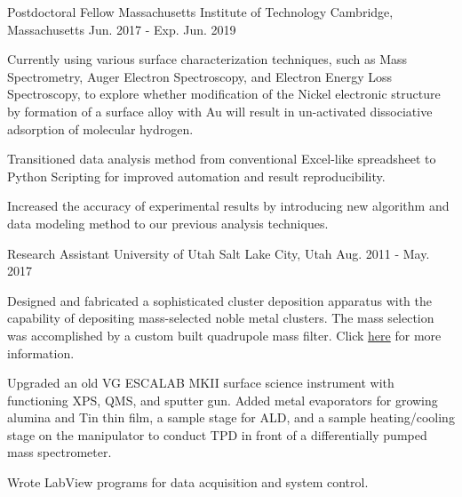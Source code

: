 


\begin{cventries}


\cventry
{Postdoctoral Fellow}
{Massachusetts Institute of Technology}
{Cambridge, Massachusetts}
{Jun. 2017 - Exp. Jun. 2019}
{
\begin{cvitems}
\item {Currently using various surface characterization techniques, such as Mass
    Spectrometry, Auger Electron Spectroscopy, and Electron Energy Loss
    Spectroscopy, to explore whether modification of the Nickel electronic
    structure by formation of a surface alloy with Au will result in
    un-activated dissociative adsorption of molecular hydrogen.}
\item {Transitioned data analysis method from conventional Excel-like
    spreadsheet to Python Scripting for improved automation and result
    reproducibility.}
\item {Increased the accuracy of experimental results by introducing new
    algorithm and data modeling method to our previous analysis techniques.}
\end{cvitems}
}


\cventry
{Research Assistant}
{University of Utah}
{Salt Lake City, Utah}
{Aug. 2011 - May. 2017}
{
\begin{cvitems}
\item {Designed and fabricated a sophisticated cluster deposition apparatus with
    the capability of depositing mass-selected noble metal clusters. The mass
    selection was accomplished by a custom built quadrupole mass filter. Click
    \href{https://www.yangdai.info/portfolio/beam-source-for-size-selected-metal-clusters}{here}
    for more information.
  }
\item {Upgraded an old VG ESCALAB MKII surface science instrument with
    functioning XPS, QMS, and sputter gun. Added metal evaporators for
    growing alumina and Tin thin film, a sample stage for ALD, and a sample
    heating/cooling stage on the manipulator to conduct TPD in front of a
    differentially pumped mass spectrometer.}
\item {Wrote LabView programs for data acquisition and system control.}
\end{cvitems}
}


\end{cventries}